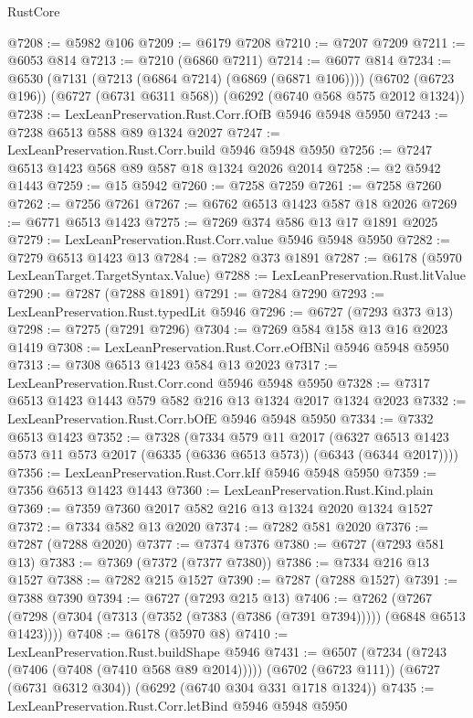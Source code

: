 \begin{lexlean}{RustCore}
\begin{coremodule}
@7208 := @5982 @106
@7209 := @6179 @7208
@7210 := @7207 @7209
@7211 := @6053 @814
@7213 := @7210 (@6860 @7211)
@7214 := @6077 @814
@7234 := @6530
    (@7131 (@7213 (@6864 @7214) (@6869 (@6871 @106))))
    (@6702 (@6723 @196))
    (@6727 (@6731 @6311 @568))
    (@6292 (@6740 @568 @575 @2012 @1324))
@7238 := LexLeanPreservation.Rust.Corr.fOfB @5946 @5948 @5950
@7243 := @7238 @6513 @588 @89 @1324 @2027
@7247 := LexLeanPreservation.Rust.Corr.build @5946 @5948 @5950
@7256 := @7247 @6513 @1423 @568 @89 @587 @18 @1324 @2026 @2014
@7258 := @2 @5942 @1443
@7259 := @15 @5942
@7260 := @7258 @7259
@7261 := @7258 @7260
@7262 := @7256 @7261
@7267 := @6762 @6513 @1423 @587 @18 @2026
@7269 := @6771 @6513 @1423
@7275 := @7269 @374 @586 @13 @17 @1891 @2025
@7279 := LexLeanPreservation.Rust.Corr.value @5946 @5948 @5950
@7282 := @7279 @6513 @1423 @13
@7284 := @7282 @373 @1891
@7287 := @6178 (@5970 LexLeanTarget.TargetSyntax.Value)
@7288 := LexLeanPreservation.Rust.litValue
@7290 := @7287 (@7288 @1891)
@7291 := @7284 @7290
@7293 := LexLeanPreservation.Rust.typedLit @5946
@7296 := @6727 (@7293 @373 @13)
@7298 := @7275 (@7291 @7296)
@7304 := @7269 @584 @158 @13 @16 @2023 @1419
@7308 := LexLeanPreservation.Rust.Corr.eOfBNil @5946 @5948 @5950
@7313 := @7308 @6513 @1423 @584 @13 @2023
@7317 := LexLeanPreservation.Rust.Corr.cond @5946 @5948 @5950
@7328 := @7317 @6513 @1423 @1443 @579 @582 @216 @13 @1324 @2017 @1324 @2023
@7332 := LexLeanPreservation.Rust.Corr.bOfE @5946 @5948 @5950
@7334 := @7332 @6513 @1423
@7352 := @7328
    (@7334
      @579
      @11
      @2017
      (@6327 @6513 @1423 @573 @11 @573 @2017 (@6335 (@6336 @6513 @573)) (@6343 (@6344 @2017))))
@7356 := LexLeanPreservation.Rust.Corr.kIf @5946 @5948 @5950
@7359 := @7356 @6513 @1423 @1443
@7360 := LexLeanPreservation.Rust.Kind.plain
@7369 := @7359 @7360 @2017 @582 @216 @13 @1324 @2020 @1324 @1527
@7372 := @7334 @582 @13 @2020
@7374 := @7282 @581 @2020
@7376 := @7287 (@7288 @2020)
@7377 := @7374 @7376
@7380 := @6727 (@7293 @581 @13)
@7383 := @7369 (@7372 (@7377 @7380))
@7386 := @7334 @216 @13 @1527
@7388 := @7282 @215 @1527
@7390 := @7287 (@7288 @1527)
@7391 := @7388 @7390
@7394 := @6727 (@7293 @215 @13)
@7406 := @7262
    (@7267 (@7298 (@7304 (@7313 (@7352 (@7383 (@7386 (@7391 @7394))))) (@6848 @6513 @1423))))
@7408 := @6178 (@5970 @8)
@7410 := LexLeanPreservation.Rust.buildShape @5946
@7431 := @6507
    (@7234 (@7243 (@7406 (@7408 (@7410 @568 @89 @2014)))))
    (@6702 (@6723 @111))
    (@6727 (@6731 @6312 @304))
    (@6292 (@6740 @304 @331 @1718 @1324))
@7435 := LexLeanPreservation.Rust.Corr.letBind @5946 @5948 @5950

\end{coremodule}
\end{lexlean}
